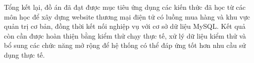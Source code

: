 Tổng kết lại, đồ án đã đạt được mục tiêu ứng dụng các kiến thức đã học từ các môn học để xây dựng website thương mại điện tử có luồng mua hàng và khu vực quản trị cơ bản, đồng thời kết nối nghiệp vụ với cơ sở dữ liệu MySQL. Kết quả còn cần được hoàn thiện bằng kiểm thử chạy thực tế, xử lý dữ liệu kiểm thử và bổ sung các chức năng mở rộng để hệ thống có thể đáp ứng tốt hơn nhu cầu sử dụng thực tế.
